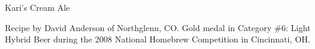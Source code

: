 \begin{recipe}{Kari's Cream Ale}

\begin{aboutblock}
Recipe by David Anderson of Northglenn, CO. Gold medal in Category \#6: Light
Hybrid Beer during the 2008 National Homebrew Competition in Cincinnati, OH.
\sourceaha
\end{aboutblock}


\begin{methodandtiming}

\begin{mashsteps}
\end{mashsteps}

\begin{fermentationsteps}
\end{fermentationsteps}

\end{methodandtiming}

\recipebreak

\begin{ingredientsblock}

\begin{malts}
\end{malts}

\begin{hops}
\end{hops}


\end{ingredientsblock}

\end{recipe}

